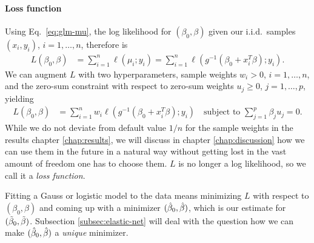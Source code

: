 \paragraph{Loss function}
Using Eq.\ \eqref{eq:glm-mu}, the log likelihood for $(\beta_0, \beta)$ given our i.i.d.\ samples 
$(x_i, y_i)$, $i = 1, \ldots, n$, therefore is
\begin{align}
    L(\beta_0, \beta) &= \sum_{i=1}^n \ell(\mu_i; y_i) 
    = \sum_{i=1}^n \ell\left( g^{-1}\left( \beta_0 + x_i^T \beta \right); y_i \right).
\end{align}
We can augment $L$ with two hyperparameters, sample weights $w_i > 0$, $i = 1, \ldots, n$, and the 
zero-sum constraint with respect to zero-sum weights $u_j \geq 0$, $j = 1, \ldots, p$, yielding 
\begin{align} \label{eq:loss-glm-no-lasso}
    L(\beta_0, \beta) &= \sum_{i=1}^n w_i \ell\left( g^{-1}\left( \beta_0 + x_i^T \beta \right); 
    y_i \right) \quad \text{subject to } \sum_{j=1}^p \beta_j u_j = 0.
\end{align}
While we do not deviate from default value $1/n$ for the sample weights in the results chapter 
\ref{chap:results}, we will discuss in chapter \ref{chap:discussion} how we can use them in the 
future in a natural way without getting lost in the vast amount of freedom one has to choose them. 
$L$ is no longer a log likelihood, so we call it a \textit{loss function}.

Fitting a Gauss or logistic model to the data means minimizing $L$ with respect to 
$(\beta_0, \beta)$ and coming up with a minimizer $(\hat{\beta}_0, \hat{\beta})$, which is our estimate for 
$(\tilde{\beta}_0, \tilde{\beta})$. Subsection \ref{subsec:elastic-net} will deal with the question how we can 
make $(\hat{\beta}_0, \hat{\beta})$ a \textit{unique} minimizer.

